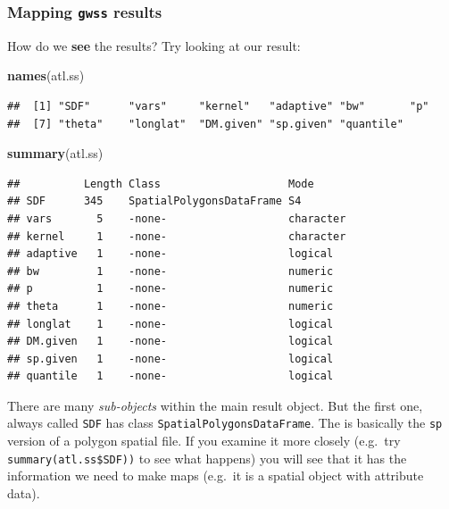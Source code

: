 \documentclass[
]{book}
\newenvironment{Shaded}{\begin{snugshade}}{\end{snugshade}}
\newcommand{\FunctionTok}[1]{\textcolor[rgb]{0.13,0.29,0.53}{\textbf{#1}}}
\newcommand{\NormalTok}[1]{#1}
\begin{document}
\hypertarget{mapping-gwss-results}{%
\subsubsection{\texorpdfstring{Mapping \texttt{gwss} results}{Mapping gwss results}}\label{mapping-gwss-results}}

How do we \textbf{see} the results? Try looking at our result:

\begin{Shaded}
\begin{Highlighting}[]
\FunctionTok{names}\NormalTok{(atl.ss)}
\end{Highlighting}
\end{Shaded}

\begin{verbatim}
##  [1] "SDF"      "vars"     "kernel"   "adaptive" "bw"       "p"       
##  [7] "theta"    "longlat"  "DM.given" "sp.given" "quantile"
\end{verbatim}

\begin{Shaded}
\begin{Highlighting}[]
\FunctionTok{summary}\NormalTok{(atl.ss)}
\end{Highlighting}
\end{Shaded}

\begin{verbatim}
##          Length Class                    Mode     
## SDF      345    SpatialPolygonsDataFrame S4       
## vars       5    -none-                   character
## kernel     1    -none-                   character
## adaptive   1    -none-                   logical  
## bw         1    -none-                   numeric  
## p          1    -none-                   numeric  
## theta      1    -none-                   numeric  
## longlat    1    -none-                   logical  
## DM.given   1    -none-                   logical  
## sp.given   1    -none-                   logical  
## quantile   1    -none-                   logical
\end{verbatim}

There are many \emph{sub-objects} within the main result object. But the first one, always called \texttt{SDF} has class \texttt{SpatialPolygonsDataFrame}. The is basically the \texttt{sp} version of a polygon spatial file. If you examine it more closely (e.g.~try \texttt{summary(atl.ss\$SDF))} to see what happens) you will see that it has the information we need to make maps (e.g.~it is a spatial object with attribute data).
\end{document}
